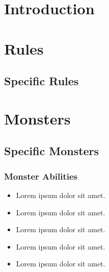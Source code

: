 \documentclass{zine}
\author{\textit{Written by YOURNAME}}
\begin{document}
\maketitle

\begin{abstract}
\hrule \vspace{2mm}
\begin{center}
    \lipsum[10]
\end{center}
\vspace{2mm} \hrule
\end{abstract}

\section{Introduction}
    \lipsum[2]

\begin{multicols*}{2}

\section{Rules}
    \lipsum[4]

\subsection*{Specific Rules}
    \lipsum[5]

\section{Monsters}
    \lipsum[6-8]

\subsection*{Specific Monsters}
\colbox{
    \lipsum[7]
}

\subsubsection*{Monster Abilities}

\begin{itemize}
    \item Lorem ipsum dolor sit amet.
    \item Lorem ipsum dolor sit amet.
    \item Lorem ipsum dolor sit amet.
    \item Lorem ipsum dolor sit amet.
    \item Lorem ipsum dolor sit amet.
\end{itemize}

\end{multicols*}
\end{document}
